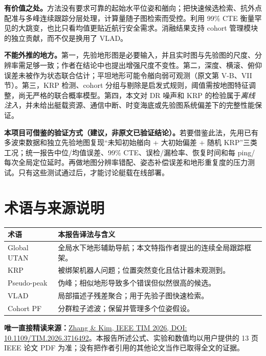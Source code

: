 \documentclass[11pt]{article}
\begin{document}
\textbf{有价值之处。}方法没有要求可靠的起始水平位姿和艏向；把快速候选检索、抗外点配准与多峰连续跟踪分层处理，计算量随子图检索而受控。利用 99\% CTE 衡量罕见的大跳变，也比只看均值更贴近航行安全需求。消融结果支持 cohort 管理模块的独立贡献，而不仅是换用了 VLAD。

\textbf{不能外推的地方。}第一，先验地形图是必要输入，并且实时图与先验图的尺度、分辨率需足够一致；作者在结论中也提出增强尺度不变性。第二，深度、横滚、俯仰误差未被作为状态联合估计；平坦地形可能令艏向弱可观测（原文第 V-B、VII 节）。第三，KRP 检测、cohort 分组与剔除是启发式规则，阈值需按地图特征调整，尚无严格的联合概率模型。第四，本文对 DR 噪声和 KRP 的检验属于\emph{离线注入}，并未给出艇载资源、通信中断、时变海底或先验图系统偏差下的完整性能保证。

\textbf{本项目可借鉴的验证方式（建议，非原文已验证结论）。}若要借鉴此法，先用已有多波束数据和独立先验地图复现“未知初始艏向 + 大初始偏差 + 随机 KRP”三类工况；统一报告中位/均值误差、99\% CTE、误检/漏检率、恢复时间和每 ping/每次全局定位延时。再做地图分辨率错配、姿态补偿误差和地形重复度的压力测试。只有这些测试通过后，才能讨论艇载在线部署。

\section*{术语与来源说明}

\begin{tabularx}{\linewidth}{lY}
\toprule
术语 & 本报告译法与含义\\
\midrule
Global UTAN & 全局水下地形辅助导航；本文特指作者提出的连续全局跟踪框架。\\
KRP & 被绑架机器人问题；位置突然变化且估计器未观测到。\\
Pseudo-peak & 伪峰；相似地形导致多个错误但似然很高的候选。\\
VLAD & 局部描述子残差聚合；用于先验子图快速检索。\\
Cohort PF & 分群粒子滤波；保留并管理多个位姿假设。\\
\bottomrule
\end{tabularx}

\vspace{0.7em}\noindent\textbf{唯一直接精读来源：}\href{https://doi.org/10.1109/TIM.2026.3716492}{Zhang \& Kim, IEEE TIM 2026, DOI: 10.1109/TIM.2026.3716492}。本报告所述公式、实验和数值均以用户提供的 13 页 IEEE 论文 PDF 为准；没有把作者引用的其他论文当作已取得全文的证据。
\end{document}
